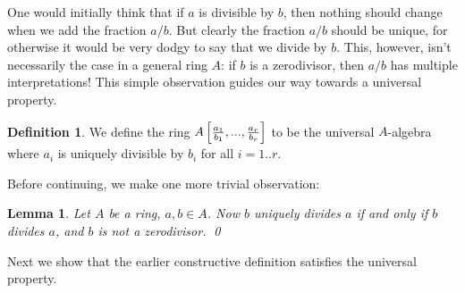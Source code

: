 \documentclass[12pt,a4paper,leqno]{article}
\theoremstyle{plain}
\newtheorem{lem}[theo]{Lemma}
\theoremstyle{definition}
\newtheorem{defn}[theo]{Definition}
\theoremstyle{remark}
\begin{document}
One would initially think that if $a$ is divisible by $b$, then nothing should change when we add the fraction $a/b$. But clearly the fraction $a/b$ should be unique, for otherwise it would be very dodgy to say that we divide by $b$. This, however, isn't necessarily the case in a general ring $A$: if $b$ is a zerodivisor, then $a/b$ has multiple interpretations! This simple observation guides our way towards a universal property.
\begin{defn}\label{UniversalProperty1}
We define the ring $A \left[ {a_1 \over b_1}, ... , {a_r \over b_r} \right]$ to be the universal $A$-algebra where $a_i$ is uniquely divisible by $b_i$ for all $i = 1..r$.
\end{defn}

Before continuing, we make one more trivial observation:

\begin{lem}
Let $A$ be a ring, $a,b \in A$. Now $b$ uniquely divides $a$ if and only if $b$ divides $a$, and $b$ is not a zerodivisor. \qed
\end{lem}

Next we show that the earlier constructive definition satisfies the universal property.
\end{document}

